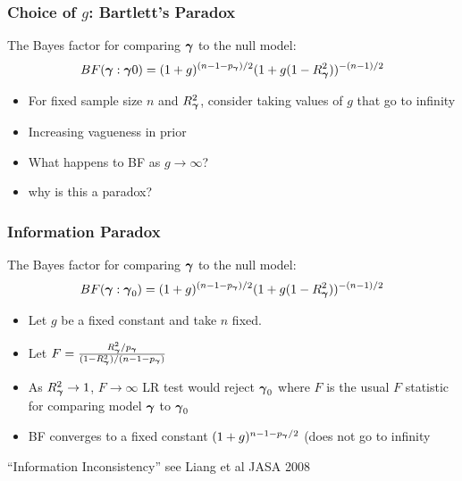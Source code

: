 \documentclass[]{beamer}
\begin{document}
\begin{frame} \frametitle{Choice of $g$: Bartlett's Paradox}


The Bayes factor for comparing $\boldsymbol{\gamma}$ to the null
model:
$$
 BF(\boldsymbol{\gamma} : \boldsymbol{\gamma}0) =    (1 + g)^{(n - 1 - p_{\boldsymbol{\gamma}})/2} (1 + g(1 - R_{\boldsymbol{\gamma}}^2))^{-(n-1)/2}
$$
\pause
\begin{itemize}
\item For fixed sample size $n$ and $R_{\boldsymbol{\gamma}}^2$, consider taking values of  $g$ that
  go to infinity  \pause
\item Increasing vagueness in prior \pause
\item What happens to BF as $g \to \infty$? \pause
\item why is this a paradox?

\end{itemize}
\end{frame}



\begin{frame}
  \frametitle{Information Paradox}

The Bayes factor for comparing $\boldsymbol{\gamma}$ to the null
model:
$$
 BF(\boldsymbol{\gamma} : \boldsymbol{\gamma}_0) =    (1 + g)^{(n - 1 - p_{\boldsymbol{\gamma}})/2} (1 + g(1 - R_{\boldsymbol{\gamma}}^2))^{-(n-1)/2}
$$
\pause
\begin{itemize}
\item Let $g$ be a fixed constant and take $n$ fixed. \pause
\item Let $F = \frac{R_{\boldsymbol{\gamma}}^2/p_{\boldsymbol{\gamma}}}{(1 - R_{\boldsymbol{\gamma}}^2)/(n - 1 - p_{\boldsymbol{\gamma}})}$ \pause
\item As $R^2_{\boldsymbol{\gamma}} \to 1$, $F \to \infty$ LR test would reject $\boldsymbol{\gamma}_0$
  where $F$ is the usual $F$ statistic for  comparing model $\boldsymbol{\gamma}$ to
  $\boldsymbol{\gamma}_0$ \pause
\item BF converges to a fixed constant $(1+g)^{n - 1 -p_{\boldsymbol{\gamma}}/2}$  (does not go
  to infinity 
\end{itemize}

``Information Inconsistency''  see Liang et al JASA 2008


\end{frame}
\end{document}
